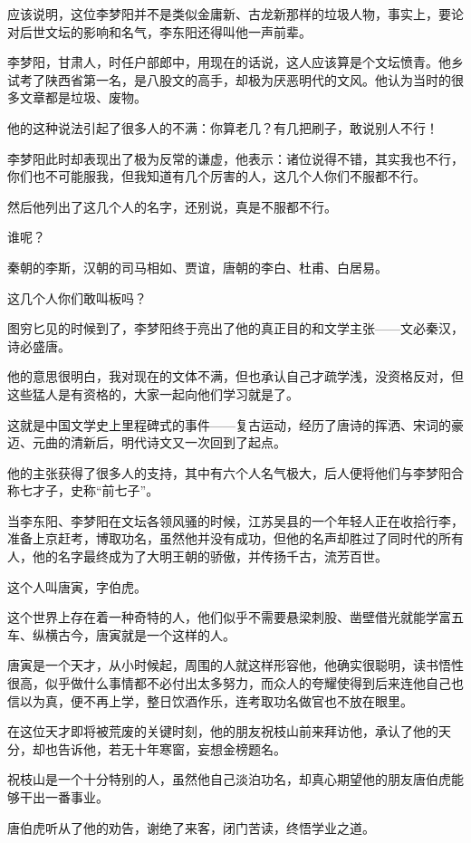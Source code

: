 \begin{multicols}{\theparacolNo}
		应该说明，这位李梦阳并不是类似金庸新、古龙新那样的垃圾人物，事实上，要论对后世文坛的影响和名气，李东阳还得叫他一声前辈。

		李梦阳，甘肃人，时任户部郎中，用现在的话说，这人应该算是个文坛愤青。他乡试考了陕西省第一名，是八股文的高手，却极为厌恶明代的文风。他认为当时的很多文章都是垃圾、废物。

		他的这种说法引起了很多人的不满：你算老几？有几把刷子，敢说别人不行！

		李梦阳此时却表现出了极为反常的谦虚，他表示：诸位说得不错，其实我也不行，你们也不可能服我，但我知道有几个厉害的人，这几个人你们不服都不行。

		然后他列出了这几个人的名字，还别说，真是不服都不行。

		谁呢？

		秦朝的李斯，汉朝的司马相如、贾谊，唐朝的李白、杜甫、白居易。

		这几个人你们敢叫板吗？

		图穷匕见的时候到了，李梦阳终于亮出了他的真正目的和文学主张——文必秦汉，诗必盛唐。

		他的意思很明白，我对现在的文体不满，但也承认自己才疏学浅，没资格反对，但这些猛人是有资格的，大家一起向他们学习就是了。

		这就是中国文学史上里程碑式的事件——复古运动，经历了唐诗的挥洒、宋词的豪迈、元曲的清新后，明代诗文又一次回到了起点。

		他的主张获得了很多人的支持，其中有六个人名气极大，后人便将他们与李梦阳合称七才子，史称“前七子”。

		当李东阳、李梦阳在文坛各领风骚的时候，江苏吴县的一个年轻人正在收拾行李，准备上京赶考，博取功名，虽然他并没有成功，但他的名声却胜过了同时代的所有人，他的名字最终成为了大明王朝的骄傲，并传扬千古，流芳百世。

		这个人叫唐寅，字伯虎。

		这个世界上存在着一种奇特的人，他们似乎不需要悬梁刺股、凿壁借光就能学富五车、纵横古今，唐寅就是一个这样的人。

		唐寅是一个天才，从小时候起，周围的人就这样形容他，他确实很聪明，读书悟性很高，似乎做什么事情都不必付出太多努力，而众人的夸耀使得到后来连他自己也信以为真，便不再上学，整日饮酒作乐，连考取功名做官也不放在眼里。

		在这位天才即将被荒废的关键时刻，他的朋友祝枝山前来拜访他，承认了他的天分，却也告诉他，若无十年寒窗，妄想金榜题名。

		祝枝山是一个十分特别的人，虽然他自己淡泊功名，却真心期望他的朋友唐伯虎能够干出一番事业。

		唐伯虎听从了他的劝告，谢绝了来客，闭门苦读，终悟学业之道。


\end{multicols}
